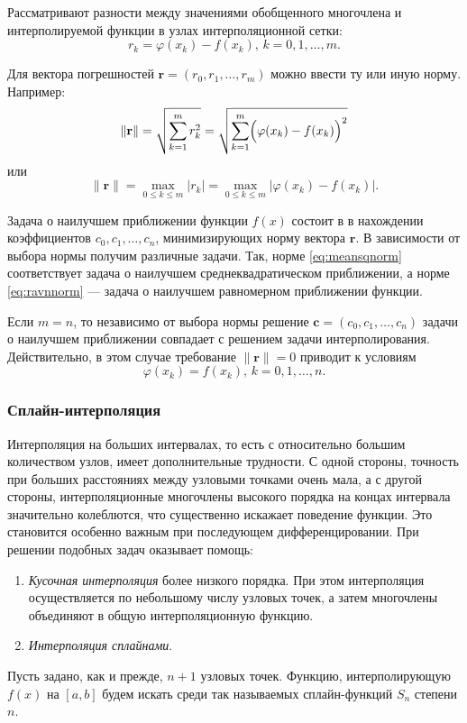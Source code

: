 Рассматривают разности между значениями обобщенного многочлена и интерполируемой
функции в узлах интерполяционной сетки:
\[
r_{k}=\varphi(x_{k})-f(x_{k}),\, k=0,1,\dots,m.
\]


Для вектора погрешностей $\mathbf{r}=\left(r_{0},r_{1},\dots,r_{m}\right)$
можно ввести ту или иную норму. Например:
\begin{equation}
\|\mathbf{r}\|=\sqrt{\sum_{k=1}^{m}r_{k}^{2}}=\sqrt{\sum_{k=1}^{m}\Bigl(\varphi(x_{k})-f(x_{k})\Bigr)^{2}}\label{eq:meansqnorm}
\end{equation}
или
\begin{equation}
\|\mathbf{r}\|=\max_{0\leqslant k\leqslant m}|r_{k}|=\max_{0\leqslant k\leqslant m}|\varphi(x_{k})-f(x_{k})|.\label{eq:ravnnorm}
\end{equation}


Задача о наилучшем приближении функции $f(x)$ состоит в в нахождении
коэффициентов $c_{0},c_{1},\dots,c_{n}$, минимизирующих норму вектора
$\mathbf{r}$. В зависимости от выбора нормы получим различные задачи.
Так, норме \eqref{eq:meansqnorm} соответствует задача о наилучшем
среднеквадратическом приближении, а норме \eqref{eq:ravnnorm} ---
задача о наилучшем равномерном приближении функции.

Если $m=n$, то независимо от выбора нормы решение $\mathbf{c}=(c_{0},c_{1},\dots,c_{n})$
задачи о наилучшем приближении совпадает с решением задачи интерполирования.
Действительно, в этом случае требование $\|\mathbf{r}\|=0$ приводит
к условиям 
\[
\varphi(x_{k})=f(x_{k}),\, k=0,1,\dots,n.
\]



\subsubsection{Сплайн-интерполяция}

Интерполяция на больших интервалах, то есть с относительно большим
количеством узлов, имеет дополнительные трудности. С одной стороны,
точность при больших расстояниях между узловыми точками очень мала,
а с другой стороны, интерполяционные многочлены высокого порядка на
концах интервала значительно колеблются, что существенно искажает
поведение функции. Это становится особенно важным при последующем
дифференцировании. При решении подобных задач оказывает помощь:
\begin{enumerate}
\item \emph{Кусочная интерполяция}
более низкого порядка. При этом интерполяция осуществляется по небольшому
числу узловых точек, а затем многочлены объединяют в общую интерполяционную
функцию.
\item \emph{Интерполяция сплайнами}.
\end{enumerate}
Пусть задано, как и прежде, $n+1$ узловых точек. Функцию, интерполирующую
$f(x)$ на $[a,b]$ будем искать среди так называемых сплайн-функций
$S_{n}$ степени $n$.


